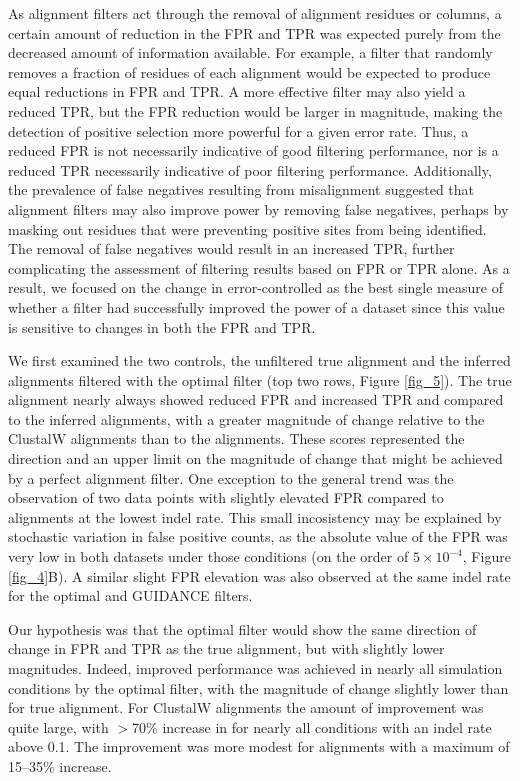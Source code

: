 \documentclass{article}
\begin{document}
As alignment filters act through the removal of alignment residues or
columns, a certain amount of reduction in the FPR and TPR was expected
purely from the decreased amount of information available. For
example, a filter that randomly removes a fraction of residues of each
alignment would be expected to produce equal reductions in FPR and
TPR. A more effective filter may also yield a reduced TPR, but the FPR
reduction would be larger in magnitude, making the detection of
positive selection more powerful for a given error rate. Thus, a
reduced FPR is not necessarily indicative of good filtering
performance, nor is a reduced TPR necessarily indicative of poor
filtering performance. Additionally, the prevalence of false negatives
resulting from misalignment suggested that alignment filters may also
improve power by removing false negatives, perhaps by masking out
residues that were preventing positive sites from being
identified. The removal of false negatives would result in an
increased TPR, further complicating the assessment of filtering
results based on FPR or TPR alone. As a result, we focused on the
change in error-controlled \tpr{} as the best single measure of
whether a filter had successfully improved the \sw power of a dataset
since this value is sensitive to changes in both the FPR and TPR.

We first examined the two controls, the unfiltered true alignment and
the inferred alignments filtered with the optimal filter (top two
rows, Figure \ref{fig_5}). The true alignment nearly always showed
reduced FPR and increased TPR and \tpr compared to the inferred
alignments, with a greater magnitude of change relative to the
ClustalW alignments than to the \prankc alignments. These scores
represented the direction and an upper limit on the magnitude of
change that might be achieved by a perfect alignment filter. One
exception to the general trend was the observation of two data points
with slightly elevated FPR compared to \prankc alignments at the
lowest indel rate. This small incosistency may be explained by
stochastic variation in false positive counts, as the absolute value
of the FPR was very low in both datasets under those conditions (on
the order of $5\times10^{-4}$, Figure \ref{fig_4}B). A similar slight FPR
elevation was also observed at the same indel rate for the optimal and
GUIDANCE filters.

Our hypothesis was that the optimal filter would show the same
direction of change in FPR and TPR as the true alignment, but with
slightly lower magnitudes. Indeed, improved \sw performance was
achieved in nearly all simulation conditions by the optimal filter,
with the magnitude of \tpr change slightly lower than for true
alignment. For ClustalW alignments the amount of improvement was quite
large, with $>$70\% increase in \tpr for nearly all conditions with an
indel rate above 0.1. The improvement was more modest for \prankc
alignments with a maximum of 15--35\% \tpr increase.
\end{document}
